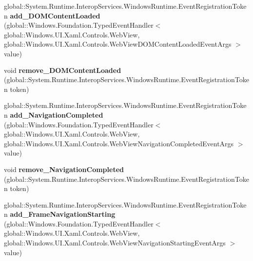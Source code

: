 \begin{DoxyCompactItemize}
\mbox{\label{interface_windows_1_1_u_i_1_1_xaml_1_1_controls_1_1_i_web_view2_ad7b79a31e2034f7e2d82141d4fb98882}} 
global\+::\+System.\+Runtime.\+Interop\+Services.\+Windows\+Runtime.\+Event\+Registration\+Token {\bfseries add\+\_\+\+D\+O\+M\+Content\+Loaded} (global\+::\+Windows.\+Foundation.\+Typed\+Event\+Handler$<$ global\+::\+Windows.\+U\+I.\+Xaml.\+Controls.\+Web\+View, global\+::\+Windows.\+U\+I.\+Xaml.\+Controls.\+Web\+View\+D\+O\+M\+Content\+Loaded\+Event\+Args $>$ value)
\item 
\mbox{\label{interface_windows_1_1_u_i_1_1_xaml_1_1_controls_1_1_i_web_view2_a4826b2efe9b800c1e85e3a78e742e78c}} 
void {\bfseries remove\+\_\+\+D\+O\+M\+Content\+Loaded} (global\+::\+System.\+Runtime.\+Interop\+Services.\+Windows\+Runtime.\+Event\+Registration\+Token token)
\item 
\mbox{\label{interface_windows_1_1_u_i_1_1_xaml_1_1_controls_1_1_i_web_view2_ac4ba94ee4e34e6437000d0e1f34a76cf}} 
global\+::\+System.\+Runtime.\+Interop\+Services.\+Windows\+Runtime.\+Event\+Registration\+Token {\bfseries add\+\_\+\+Navigation\+Completed} (global\+::\+Windows.\+Foundation.\+Typed\+Event\+Handler$<$ global\+::\+Windows.\+U\+I.\+Xaml.\+Controls.\+Web\+View, global\+::\+Windows.\+U\+I.\+Xaml.\+Controls.\+Web\+View\+Navigation\+Completed\+Event\+Args $>$ value)
\item 
\mbox{\label{interface_windows_1_1_u_i_1_1_xaml_1_1_controls_1_1_i_web_view2_a7c6af1243cf0100a4028f3aaaf48f8b2}} 
void {\bfseries remove\+\_\+\+Navigation\+Completed} (global\+::\+System.\+Runtime.\+Interop\+Services.\+Windows\+Runtime.\+Event\+Registration\+Token token)
\item 
\mbox{\label{interface_windows_1_1_u_i_1_1_xaml_1_1_controls_1_1_i_web_view2_ad33eb6ddf290983e9f6e350de4ac2d33}} 
global\+::\+System.\+Runtime.\+Interop\+Services.\+Windows\+Runtime.\+Event\+Registration\+Token {\bfseries add\+\_\+\+Frame\+Navigation\+Starting} (global\+::\+Windows.\+Foundation.\+Typed\+Event\+Handler$<$ global\+::\+Windows.\+U\+I.\+Xaml.\+Controls.\+Web\+View, global\+::\+Windows.\+U\+I.\+Xaml.\+Controls.\+Web\+View\+Navigation\+Starting\+Event\+Args $>$ value)

\end{DoxyCompactItemize}
